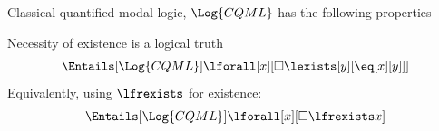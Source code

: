 \documentclass[../../../include/open-logic-section]{subfiles}
\begin{document}


Classical quantified modal logic, $\Log{CQML}$ has 
the following properties

Necessity of existence is a logical truth
$$\Entails[\Log{CQML}] \lforall[x][\Box\lexists[y][\eq[x][y]]]$$
Equivalently, using $\lfrexists$ for existence:
$$\Entails[\Log{CQML}] \lforall[x][\Box\lfrexists x]$$

\end{document}
